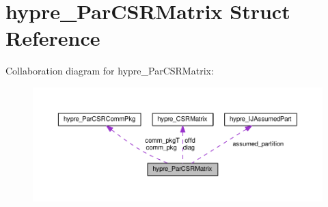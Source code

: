 \hypertarget{structhypre__ParCSRMatrix}{}\section{hypre\+\_\+\+Par\+C\+S\+R\+Matrix Struct Reference}
\label{structhypre__ParCSRMatrix}


Collaboration diagram for hypre\+\_\+\+Par\+C\+S\+R\+Matrix\+:
\nopagebreak
\begin{figure}[H]
\begin{center}
\leavevmode
\includegraphics[width=350pt]{structhypre__ParCSRMatrix__coll__graph}
\end{center}
\end{figure}
